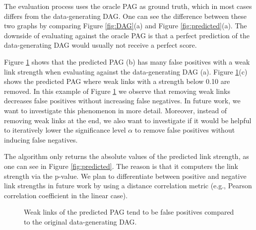 \documentclass[conference]{IEEEtran}
\begin{document}
The evaluation process uses the oracle PAG as ground truth, which in most cases differs from the data-generating DAG. One can see the difference between these two graphs by comparing Figure \ref{fig:DAG}(a) and Figure \ref{fig:predicted}(a). The downside of evaluating against the oracle PAG is that a perfect prediction of the data-generating DAG would usually not receive a perfect score.

Figure \ref{fig:removed} shows that the predicted PAG (b) has many false positives with a weak link strength when evaluating against the data-generating DAG (a). Figure \ref{fig:removed}(c) shows the predicted PAG where weak links with a strength below 0.10 are removed. In this example of Figure \ref{fig:removed} we observe that removing weak links decreases false positives without increasing false negatives. In future work, we want to investigate this phenomenon in more detail. Moreover, instead of removing weak links at the end, we also want to investigate if it would be helpful to iteratively lower the significance level $\alpha$ to remove false positives without inducing false negatives.

The algorithm only returns the absolute values of the predicted link strength, as one can see in Figure \ref{fig:predicted}. The reason is that it computers the link strength via the p-value. We plan to differentiate between positive and negative link strengths in future work by using a distance correlation metric (e.g., Pearson correlation coefficient in the linear case).



\begin{figure}[htbp]
    \centering
    \caption{Weak links of the predicted PAG tend to be false positives compared to the original data-generating DAG.}
        \label{fig:removed}
\end{figure}
\end{document}
